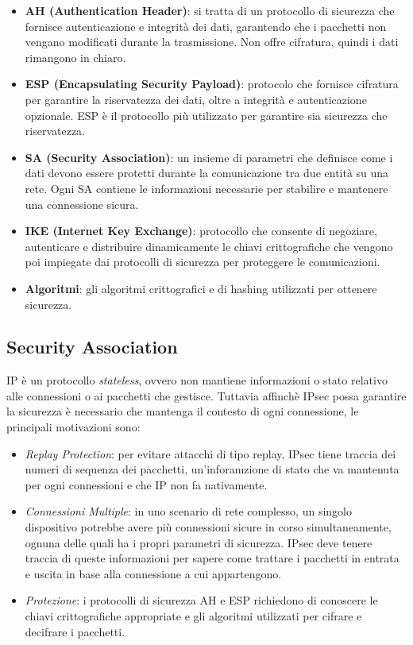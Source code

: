 \begin{itemize}
    \item \textbf{AH (Authentication Header)}: si tratta di un protocollo di sicurezza che fornisce autenticazione e integrità dei dati,
    garantendo che i pacchetti non vengano modificati durante la trasmissione. Non offre cifratura, quindi i dati rimangono in chiaro. 
    \item \textbf{ESP (Encapsulating Security Payload)}: protocolo che fornisce cifratura per garantire la riservatezza dei dati,
    oltre a integrità e autenticazione opzionale. ESP è il protocollo più utilizzato
    per garantire sia sicurezza che riservatezza.
    
    \item \textbf{SA (Security Association)}: un insieme di parametri che definisce come i dati devono essere protetti durante la comunicazione tra due entità su una rete. Ogni SA contiene le informazioni necessarie per stabilire e mantenere una connessione sicura.
    \item \textbf{IKE (Internet Key Exchange)}: protocollo che consente di negoziare, autenticare e distribuire dinamicamente le chiavi crittografiche che vengono poi impiegate dai protocolli di sicurezza per proteggere le comunicazioni.
    \item \textbf{Algoritmi}: gli algoritmi crittografici e di hashing utilizzati per ottenere sicurezza.
\end{itemize}


\subsection{Security Association}

IP è un protocollo \textit{stateless}, ovvero non mantiene informazioni o stato relativo alle connessioni o ai pacchetti che gestisce.
Tuttavia affinchè IPsec possa garantire la sicurezza è necessario che mantenga il contesto di ogni connessione, le principali motivazioni sono:
\begin{itemize}
    \item \textit{Replay Protection}: per evitare attacchi di tipo replay, IPsec tiene  traccia
    dei numeri di sequenza dei pacchetti, un'inforamzione di stato che va mantenuta per ogni connessioni
    e che IP non fa nativamente.
    \item \textit{Connessioni Multiple}: in uno scenario di rete complesso, un singolo dispositivo potrebbe avere più connessioni sicure in corso simultanea\-mente, ognuna
    delle quali ha i propri parametri di sicurezza. IPsec deve tenere traccia di queste informazioni per sapere come trattare i pacchetti in entrata e uscita in base alla connessione a cui appartengono.
    \item \textit{Protezione}: i protocolli di sicurezza AH e ESP richiedono di conoscere le chiavi crittografiche appropriate e gli algoritmi utilizzati per cifrare e decifrare i pacchetti.
\end{itemize}

